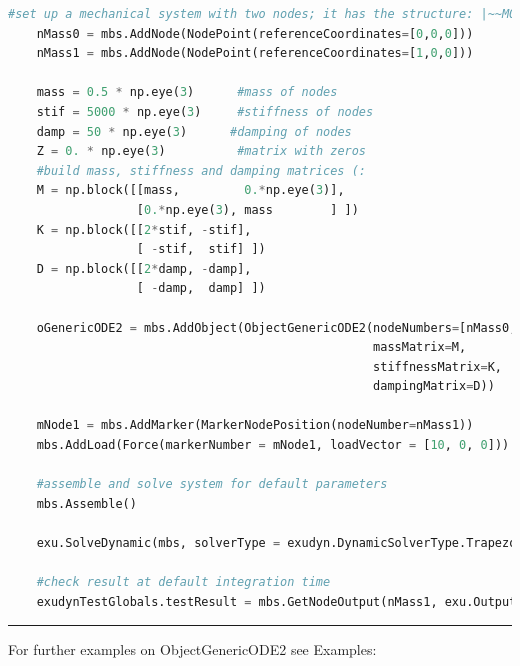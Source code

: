 \label{miniExample_ObjectGenericODE2}
\pythonstyle
\begin{lstlisting}[language=Python, firstnumber=1]
    #set up a mechanical system with two nodes; it has the structure: |~~M0~~M1
    nMass0 = mbs.AddNode(NodePoint(referenceCoordinates=[0,0,0]))
    nMass1 = mbs.AddNode(NodePoint(referenceCoordinates=[1,0,0]))

    mass = 0.5 * np.eye(3)      #mass of nodes
    stif = 5000 * np.eye(3)     #stiffness of nodes
    damp = 50 * np.eye(3)      #damping of nodes
    Z = 0. * np.eye(3)          #matrix with zeros
    #build mass, stiffness and damping matrices (:
    M = np.block([[mass,         0.*np.eye(3)],
                  [0.*np.eye(3), mass        ] ])
    K = np.block([[2*stif, -stif],
                  [ -stif,  stif] ])
    D = np.block([[2*damp, -damp],
                  [ -damp,  damp] ])
    
    oGenericODE2 = mbs.AddObject(ObjectGenericODE2(nodeNumbers=[nMass0,nMass1], 
                                                   massMatrix=M, 
                                                   stiffnessMatrix=K,
                                                   dampingMatrix=D))
    
    mNode1 = mbs.AddMarker(MarkerNodePosition(nodeNumber=nMass1))
    mbs.AddLoad(Force(markerNumber = mNode1, loadVector = [10, 0, 0])) #static solution=10*(1/5000+1/5000)=0.0004

    #assemble and solve system for default parameters
    mbs.Assemble()
    
    exu.SolveDynamic(mbs, solverType = exudyn.DynamicSolverType.TrapezoidalIndex2)

    #check result at default integration time
    exudynTestGlobals.testResult = mbs.GetNodeOutput(nMass1, exu.OutputVariableType.Position)[0]

\end{lstlisting}

\vspace{6pt}\par\noindent\rule{\textwidth}{0.4pt}
%
\noindent For further examples on ObjectGenericODE2 see Examples:
\bi
\item{}\ei

